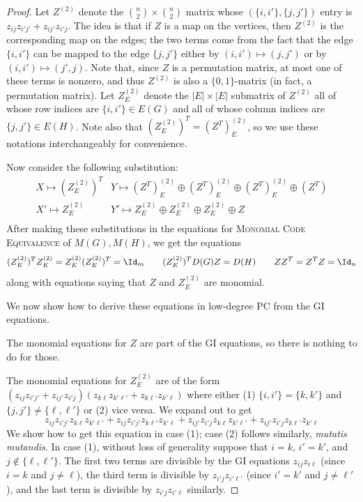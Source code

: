 \begin{proof}
Let $Z^{(2)}$ denote the $\binom{n}{2} \times \binom{n}{2}$ matrix whose $(\{i,i'\}, \{j,j'\})$ entry is $z_{ij} z_{i'j'} + z_{ij'} z_{i'j}$. The idea is that if $Z$ is a map on the vertices, then $Z^{(2)}$ is the corresponding map on the edges; the two terms come from the fact that the edge $\{i,i'\}$ can be mapped to the edge $\{j,j'\}$ either by $(i,i') \mapsto (j,j')$ or by $(i,i') \mapsto (j',j)$. Note that, since $Z$ is a permutation matrix, at most one of these terms is nonzero, and thus $Z^{(2)}$ is also a $\{0,1\}$-matrix (in fact, a permutation matrix). Let $Z^{(2)}_E$ denote the $|E| \times |E|$ submatrix of $Z^{(2)}$ all of whose row indices are $\{i,i'\} \in E(G)$ and all of whose column indices are $\{j,j'\} \in E(H)$. Note also that $(Z^{(2)}_E)^T = (Z^T)^{(2)}_E$, so we use these notations interchangeably for convenience.

Now consider the following substitution:
\[
\begin{array}{ll}
X \mapsto (Z^{(2)}_E)^T & Y \mapsto (Z^T)^{(2)}_E \oplus (Z^T)^{(2)}_E \oplus (Z^T)^{(2)}_E \oplus (Z^T)  \\
X' \mapsto Z^{(2)}_E & Y' \mapsto Z^{(2)}_E \oplus Z^{(2)}_E \oplus Z^{(2)}_E \oplus Z \\
\end{array}
\]
After making these substitutions in the equations for \textsc{Monomial Code Equivalence} of $M(G), M(H)$, we get the equations
\begin{equation} \label{eq:monGI}
(Z^{(2)}_E)^T Z^{(2)}_E = Z^{(2)}_E (Z^{(2)}_E)^T = \Id_m \qquad (Z^{(2)}_E)^T D(G) Z = D(H) \qquad ZZ^T = Z^T Z = \Id_n
\end{equation}
along with equations saying that $Z$ and $Z^{(2)}_E$ are monomial.

We now show how to derive these equations in low-degree PC from the \textsc{GI} equations. 

The monomial equations for $Z$ are part of the \textsc{GI} equations, so there is nothing to do for those.

The monomial equations for $Z^{(2)}_E$ are of the form $(z_{ij} z_{i'j'} + z_{ij'} z_{i'j})(z_{k\ell} z_{k'\ell'} + z_{k\ell'} z_{k'\ell})$ where either (1) $\{i,i'\} = \{k,k'\}$ and $\{j,j'\} \neq \{\ell,\ell'\}$ or (2) vice versa. We expand out to get 
\[
z_{ij} z_{i'j'} z_{k\ell} z_{k'\ell'} + z_{ij} z_{i'j'} z_{k\ell'} z_{k'\ell} + z_{ij'} z_{i'j}z_{k\ell} z_{k'\ell'} + z_{ij'} z_{i'j} z_{k\ell'} z_{k'\ell}
\]
We show how to get this equation in case (1); case (2) follows similarly, \emph{mutatis mutandis}. In case (1), without loss of generality suppose that $i=k$, $i'=k'$, and $j \notin \{\ell,\ell'\}$. The first two terms are divisible by the \textsc{GI} equations $z_{ij} z_{i \ell}$ (since $i=k$ and $j \neq \ell$), the third term is divisible by $z_{i'j} z_{i' \ell'}$ (since $i'=k'$ and $j \neq \ell'$), and the last term is divisible by $z_{i'j} z_{i' \ell}$ similarly.


\end{proof}
